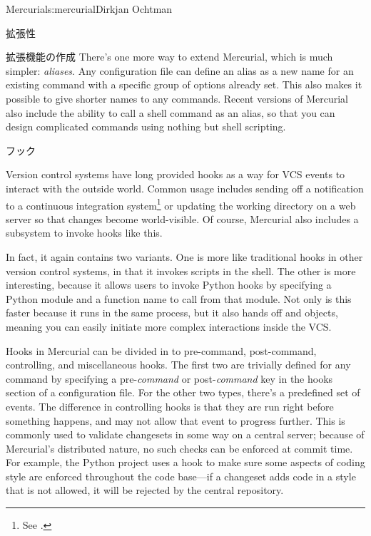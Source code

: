 \begin{aosachapter}{Mercurial}{s:mercurial}{Dirkjan Ochtman}
\begin{aosasect1}{拡張性}
\begin{aosasect2}{拡張機能の作成}
There's one more way to extend Mercurial, which is much simpler:
\emph{aliases}. Any configuration file can define an alias as a new
name for an existing command with a specific group of options already
set. This also makes it possible to give shorter names to any
commands. Recent versions of Mercurial also include the ability to
call a shell command as an alias, so that you can design complicated
commands using nothing but shell scripting.

\end{aosasect2}

\begin{aosasect2}{フック}

Version control systems have long provided hooks as a way for VCS
events to interact with the outside world. Common usage includes
sending off a notification to a continuous integration
system\footnote{See .} or updating the
working directory on a web server so that changes become
world-visible. Of course, Mercurial also includes a subsystem to
invoke hooks like this.

In fact, it again contains two variants. One is more like traditional
hooks in other version control systems, in that it invokes scripts in
the shell. The other is more interesting, because it allows users to
invoke Python hooks by specifying a Python module and a function name
to call from that module. Not only is this faster because it runs in
the same process, but it also hands off  and  objects, meaning
you can easily initiate more complex interactions inside the VCS.

Hooks in Mercurial can be divided in to pre-command, post-command,
controlling, and miscellaneous hooks. The first two are trivially
defined for any command by specifying a pre-\emph{command} or
post-\emph{command} key in the hooks section of a configuration
file. For the other two types, there's a predefined set of events. The
difference in controlling hooks is that they are run right before
something happens, and may not allow that event to progress further.
This is commonly used to validate changesets in some way on a central
server; because of Mercurial's distributed nature, no such checks can
be enforced at commit time. For example, the Python project uses a
hook to make sure some aspects of coding style are enforced throughout
the code base---if a changeset adds code in a style that is not
allowed, it will be rejected by the central repository.


\end{aosasect2}
\end{aosasect1}
\end{aosachapter}
